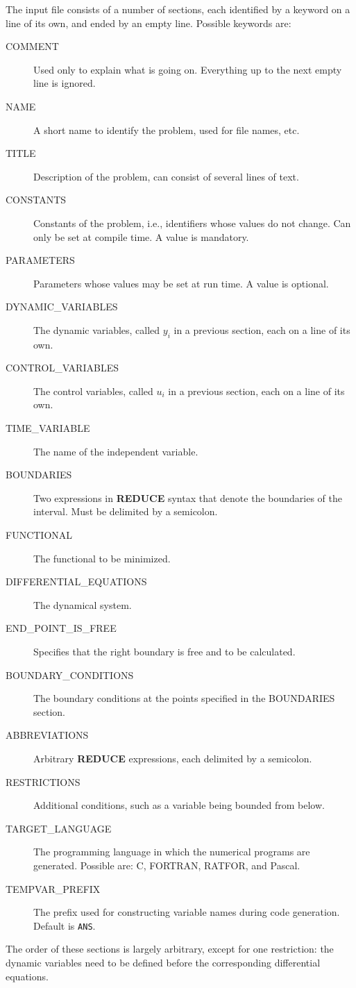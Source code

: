 \documentclass[12pt,a4paper]{article}
\newcommand{\REDUCE}{{\sf\bf REDUCE}}
\newcommand{\FORTRAN}{{\sf FORTRAN}}
\newcommand{\RATFOR}{{\sf RATFOR}}
\newcommand{\Pascal}{{\sc Pascal}}
\newcommand{\C}{{\sf C}}
\begin{document}
The input file consists of a number of sections, each identified by a
keyword on a line of its own, and ended by an empty line. Possible
keywords are:
\begin{description}
  \item [COMMENT] Used only to explain what is going on. Everything up
        to the next empty line is ignored.
  \item [NAME] A short name to identify the problem, used for file
        names, etc.
  \item [TITLE] Description of the problem, can consist of several
        lines of text.
  \item [CONSTANTS] Constants of the problem, i.e., identifiers whose
        values do not change. Can only be set at compile time. A value
        is mandatory.
  \item [PARAMETERS] Parameters whose values may be set at run time.
        A value is optional.
  \item [DYNAMIC\_VARIABLES] The dynamic variables, called $y_{i}$ in a
        previous section, each on a line of its own.
  \item [CONTROL\_VARIABLES] The control variables, called $u_{i}$ in
        a previous section, each on a line of its own.
  \item [TIME\_VARIABLE] The name of the independent variable.
  \item [BOUNDARIES] Two expressions in \REDUCE{} syntax that denote
        the boundaries of the interval. Must be delimited by a
        semicolon.
  \item [FUNCTIONAL] The functional to be minimized.
  \item [DIFFERENTIAL\_EQUATIONS] The dynamical system.
  \item [END\_POINT\_IS\_FREE] Specifies that the right boundary is free
        and to be calculated.
  \item [BOUNDARY\_CONDITIONS] The boundary conditions at the points
        specified in the BOUNDARIES section.
  \item [ABBREVIATIONS] Arbitrary \REDUCE{} expressions, each
        delimited by a semicolon. 
  \item [RESTRICTIONS] Additional conditions, such as a variable being
        bounded from below.
  \item [TARGET\_LANGUAGE] The programming language in which the numerical
        programs are generated. Possible are: \C, \FORTRAN, \RATFOR, and \Pascal.
  \item [TEMPVAR\_PREFIX] The prefix used for constructing variable names during
        code generation. Default is \verb|ANS|.
\end{description}
The order of these sections is largely arbitrary, except for one
restriction: the dynamic variables need to be defined before the
corresponding differential equations.
\end{document}

